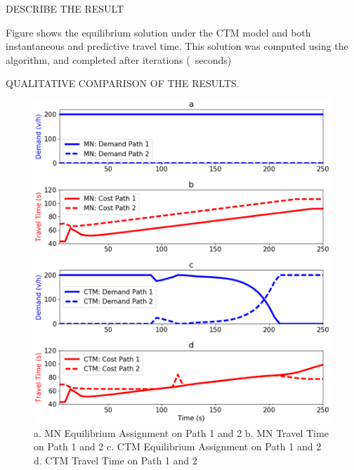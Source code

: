 DESCRIBE THE RESULT

Figure \XXX shows the equilibrium solution under the CTM model and both instantaneous and predictive travel time. This solution was computed using the \XXX algorithm, and completed after \XXX iterations (~\XXX seconds)

QUALITATIVE COMPARISON OF THE RESULTS.

\begin{figure}[h]
    \centering
    \includegraphics[width=\linewidth]{figs/Paper_dta_results_mn_ctm.PNG}
    \caption{a. MN Equilibrium Assignment on Path 1 and 2 b. MN Travel Time on Path 1 and 2 c. CTM Equilibrium Assignment on Path 1 and 2 d. CTM Travel Time on Path 1 and 2 }
    \label{fig:DTA_Results}
\end{figure}

